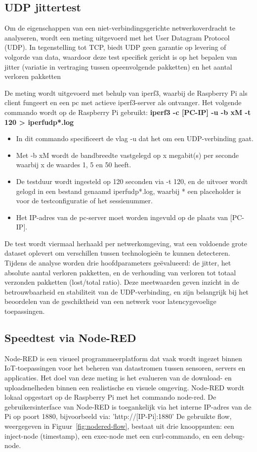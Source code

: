 \subsection{UDP jittertest}
Om de eigenschappen van een niet-verbindingsgerichte netwerkoverdracht te analyseren, wordt een meting uitgevoerd met het User Datagram Protocol (UDP). In tegenstelling tot TCP, biedt UDP geen garantie op levering of volgorde van data, waardoor deze test specifiek gericht is op het bepalen van jitter (variatie in vertraging tussen opeenvolgende pakketten) en het aantal verloren pakketten


De meting wordt uitgevoerd met behulp van iperf3, waarbij de Raspberry Pi als client fungeert en een pc met actieve iperf3-server als ontvanger. Het volgende commando wordt op de Raspberry Pi gebruikt: \textbf{iperf3 -c [PC-IP] -u -b xM -t 120 > iperfudp*.log}

\begin{itemize}
    \item In dit commando specificeert de vlag -u dat het om een UDP-verbinding gaat. 
    \item Met -b xM wordt de bandbreedte vastgelegd op x megabit(s) per seconde waarbij x de waardes 1, 5 en 50 heeft.
    \item De testduur wordt ingesteld op 120 seconden via -t 120, en de uitvoer wordt gelogd in een bestand genaamd iperfudp*.log, waarbij * een placeholder is voor de testconfiguratie of het sessienummer. 
    \item Het IP-adres van de pc-server moet worden ingevuld op de plaats van [PC-IP].
\end{itemize}


De test wordt viermaal herhaald per netwerkomgeving, wat een voldoende grote dataset oplevert om verschillen tussen technologieën te kunnen detecteren. 
Tijdens de analyse worden drie hoofdparameters geëvalueerd: de jitter, het absolute aantal verloren pakketten, en de verhouding van verloren tot totaal verzonden pakketten (lost/total ratio). Deze meetwaarden geven inzicht in de betrouwbaarheid en stabiliteit van de UDP-verbinding, en zijn belangrijk bij het beoordelen van de geschiktheid van een netwerk voor latencygevoelige toepassingen.



\subsection{Speedtest via Node-RED}
Node-RED is een visueel programmeerplatform dat vaak wordt ingezet binnen IoT-toepassingen voor het beheren van datastromen tussen sensoren, servers en applicaties. Het doel van deze meting is het evalueren van de download- en uploadsnelheden binnen een realistische en visuele omgeving. 
Node-RED wordt lokaal opgestart op de Raspberry Pi met het commando node-red. De gebruikersinterface van Node-RED is toegankelijk via het interne IP-adres van de Pi op poort 1880, bijvoorbeeld via: ’http://[IP-Pi]:1880’
De gebruikte flow, weergegeven in Figuur~\ref{fig:nodered-flow}, bestaat uit drie knooppunten: een inject-node (timestamp), een exec-node met een curl-commando, en een debug-node. 

